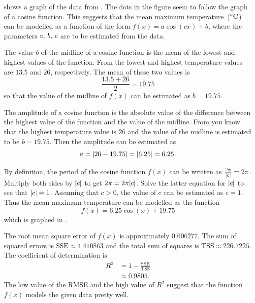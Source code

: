 \documentclass[a4paper,oneside,12pt]{article}
\begin{document}
\begin{solution}
 shows a graph of the
data from .  The
dots in the figure seem to follow the graph of a cosine function.
This suggests that the mean maximum temperature~(${}^{\circ}\textrm{C}$) can be
modelled as a function of the form $f(x) = a \cos(cx) + b$, where the
parameters ${a},\, {b},\, {c}$ are to be estimated from the data.

The value $b$ of the midline of a cosine function is the mean of the
lowest and highest values of the function.  From
 the lowest and
highest temperature values are $13.5$ and $26$, respectively.  The
mean of these two values is
\[
\frac{13.5 + 26}{2}
=
19.75
\]
so that the value of the midline of $f(x)$ can be estimated as
$b = 19.75$.

The amplitude of a cosine function is the absolute value of the
difference between the highest value of the function and the value of
the midline.
From  you know
that the highest temperature value is $26$ and the value of the
midline is estimated to be $b = 19.75$.  Then the amplitude can be
estimated as
\[
a
=
\lvert26 - 19.75\rvert
=
\lvert6.25\rvert
=
6.25.
\]

By definition, the period of the cosine function $f(x)$ can be written
as $\frac{2\pi}{\lvert c\rvert} = 2\pi$.  Multiply both sides by
$\lvert c\rvert$ to get $2\pi = 2\pi\lvert c\rvert$.  Solve the
latter equation for $\lvert c\rvert$ to see that
$\lvert c\rvert = 1$.  Assuming that $c > 0$, the value of $c$ can
be estimated as $c = 1$.  Thus the mean maximum temperature can be
modelled as the function
\begin{equation}
\label{eqn:trigonometric:mean_max_temperature_prediction}
f(x)
=
6.25 \cos(x) + 19.75
\end{equation}
which is graphed in .

The root mean square error of $f(x)$ is approximately $0.606277$.  The
sum of squared errors is $\text{SSE} \approx 4.410863$ and the total
sum of squares is $\text{TSS} \approx 226.7225$.  The coefficient of
determination is
\begin{align*}
R^2
&=
1 - \frac{\text{SSE}}{\text{TSS}} \\[4pt]
&\approx
0.9805.
\end{align*}
The low value of the RMSE and the high value of $R^2$ suggest that the
function $f(x)$ models the given data pretty well.
\end{solution}
\end{document}
